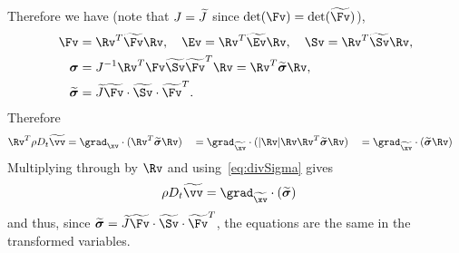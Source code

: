 Therefore we have (note that $J=\widetilde{J}$ since $\det(\Fv)=\det(\Fvt)$), 
\begin{align}
   \Fv &= \Rv^T \Fvt\Rv, \quad \Ev = \Rv^T \Evt\Rv, \quad  \Sv = \Rv^T \Svt\Rv,\\
   \sigmav &= J^{-1} \Rv^T\Fv \Svt \Fvt^T \Rv = \Rv^T \sigmavt \Rv, \\
   \sigmavt &= \Jt \Fvt\cdot\Svt\cdot\Fvt^{T} . 
\end{align}
Therefore
\begin{align}
  \Rv^T \rho D_t \vvt &= \grad_{\xv}\cdot( \Rv^T \sigmavt \Rv)  \quad
                      = \grad_{\xvt}\cdot( |\Rv| \Rv \Rv^T \sigmavt \Rv) \quad
                      = \grad_{\xvt}\cdot( \sigmavt \Rv) 
\end{align}
Multiplying through by $\Rv$ and using~\eqref{eq:divSigma} gives
\begin{align}
  \rho D_t \vvt &= \grad_{\xvt}\cdot( \sigmavt) 
\end{align}
and thus, since $\sigmavt = \Jt \Fvt\cdot\Svt\cdot\Fvt^{T}$,
the equations are the same in the transformed variables. 



